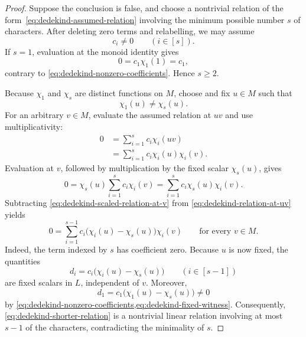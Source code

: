 \documentclass[11pt]{article}
\theoremstyle{plain}
\theoremstyle{definition}
\theoremstyle{remark}
\begin{document}
\begin{proof}
Suppose the conclusion is false, and choose a nontrivial relation of the
form~\eqref{eq:dedekind-assumed-relation} involving the minimum possible
number $s$ of characters.  After deleting zero terms and relabelling, we may
assume
\begin{equation}
  c_i\ne0
  \qquad(i\in[s]).
  \label{eq:dedekind-nonzero-coefficients}
\end{equation}
If $s=1$, evaluation at the monoid identity gives
\[
  0=c_1\chi_1(1)=c_1,
\]
contrary to \eqref{eq:dedekind-nonzero-coefficients}.  Hence $s\ge2$.

Because $\chi_1$ and $\chi_s$ are distinct functions on $M$, choose and fix
$u\in M$ such that
\begin{equation}
  \chi_1(u)\ne\chi_s(u).
  \label{eq:dedekind-fixed-witness}
\end{equation}
For an arbitrary $v\in M$, evaluate the assumed relation at $uv$ and use
multiplicativity:
\begin{equation}
\begin{aligned}
  0
  &=\sum_{i=1}^s c_i\chi_i(uv)\\
  &=\sum_{i=1}^s c_i\chi_i(u)\chi_i(v).
\end{aligned}
  \label{eq:dedekind-relation-at-uv}
\end{equation}
Evaluation at $v$, followed by multiplication by the fixed scalar
$\chi_s(u)$, gives
\begin{equation}
  0
  =\chi_s(u)\sum_{i=1}^s c_i\chi_i(v)
  =\sum_{i=1}^s c_i\chi_s(u)\chi_i(v).
  \label{eq:dedekind-scaled-relation-at-v}
\end{equation}
Subtracting \eqref{eq:dedekind-scaled-relation-at-v} from
\eqref{eq:dedekind-relation-at-uv} yields
\begin{equation}
  0=\sum_{i=1}^{s-1}
      c_i\bigl(\chi_i(u)-\chi_s(u)\bigr)\chi_i(v)
  \qquad\text{for every }v\in M.
  \label{eq:dedekind-shorter-relation}
\end{equation}
Indeed, the term indexed by $s$ has coefficient zero.  Because $u$ is now
fixed, the quantities
\[
  d_i=c_i\bigl(\chi_i(u)-\chi_s(u)\bigr)
  \qquad(i\in[s-1])
\]
are fixed scalars in $L$, independent of $v$.  Moreover,
\[
  d_1=c_1\bigl(\chi_1(u)-\chi_s(u)\bigr)\ne0
\]
by \cref{eq:dedekind-nonzero-coefficients,eq:dedekind-fixed-witness}.
Consequently, \eqref{eq:dedekind-shorter-relation} is a nontrivial linear
relation involving at most $s-1$ of the characters, contradicting the
minimality of $s$.
\end{proof}
\end{document}
